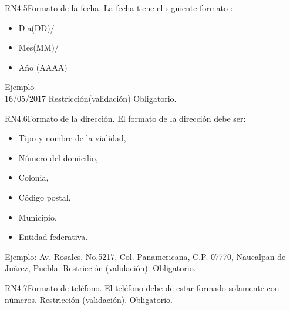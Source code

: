 
\begin{BussinesRule}{RN4.5}{Formato de la fecha.}
	\BRitem[Descripción:] La fecha tiene el siguiente formato :
		\begin{itemize} 
			\item Dia(DD)/ 
			\item Mes(MM)/
			\item Año (AAAA)
		\end{itemize}
Ejemplo \\
	16/05/2017
	\BRitem[Tipo:] Restricción(validación)
	\BRitem[Nivel:] Obligatorio.
\end{BussinesRule}


\begin{BussinesRule}{RN4.6}{Formato de la dirección.} 
	\BRitem[Descripción:]El formato de la dirección debe ser:
		\begin{itemize}
			\item Tipo y nombre de la vialidad, 
			\item Número del domicilio, 
			\item Colonia, 
			\item Código postal, 
			\item Municipio, 
			\item Entidad federativa.
		\end{itemize}
	Ejemplo: Av. Rosales, No.5217, Col. Panamericana, C.P. 07770, Naucalpan de Juárez, Puebla.	
	\BRitem[Tipo:] Restricción (validación).
	\BRitem[Nivel:] Obligatorio.
\end{BussinesRule}


\begin{BussinesRule}{RN4.7}{Formato de teléfono.} 
	\BRitem[Descripción:] El teléfono debe de estar formado solamente con números.
	\BRitem[Tipo:] Restricción (validación).
	\BRitem[Nivel:] Obligatorio.
\end{BussinesRule}


